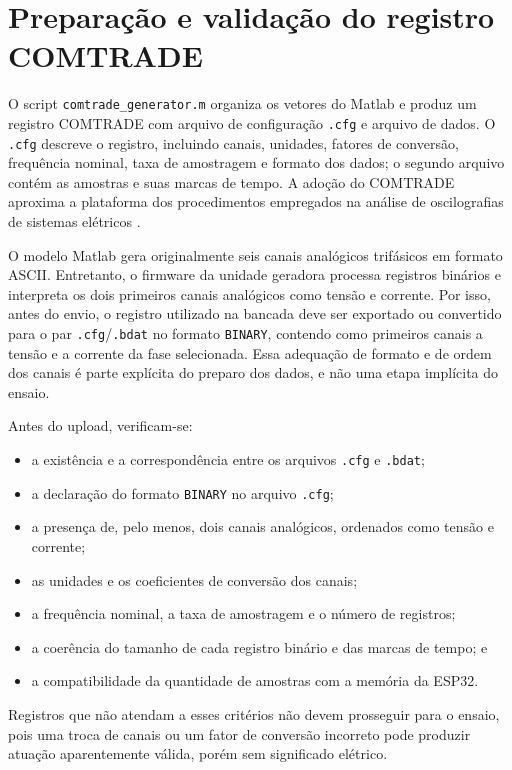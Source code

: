 \section{Preparação e validação do registro COMTRADE}

O script \texttt{comtrade\_generator.m} organiza os vetores do Matlab e produz um registro COMTRADE com arquivo de configuração \texttt{.cfg} e arquivo de dados. O \texttt{.cfg} descreve o registro, incluindo canais, unidades, fatores de conversão, frequência nominal, taxa de amostragem e formato dos dados; o segundo arquivo contém as amostras e suas marcas de tempo. A adoção do COMTRADE aproxima a plataforma dos procedimentos empregados na análise de oscilografias de sistemas elétricos \cite{ieee_comtrade,iec_60255_24_2013}.

O modelo Matlab gera originalmente seis canais analógicos trifásicos em formato ASCII. Entretanto, o firmware  da unidade geradora processa registros binários e interpreta os dois primeiros canais analógicos como tensão e corrente. Por isso, antes do envio, o registro utilizado na bancada deve ser exportado ou convertido para o par \texttt{.cfg}/\texttt{.bdat} no formato \texttt{BINARY}, contendo como primeiros canais a tensão e a corrente da fase selecionada. Essa adequação de formato e de ordem dos canais é parte explícita do preparo dos dados, e não uma etapa implícita do ensaio.

Antes do upload, verificam-se:

\begin{itemize}
  \item a existência e a correspondência entre os arquivos \texttt{.cfg} e \texttt{.bdat};
  \item a declaração do formato \texttt{BINARY} no arquivo \texttt{.cfg};
  \item a presença de, pelo menos, dois canais analógicos, ordenados como tensão e corrente;
  \item as unidades e os coeficientes de conversão dos canais;
  \item a frequência nominal, a taxa de amostragem e o número de registros;
  \item a coerência do tamanho de cada registro binário e das marcas de tempo; e
  \item a compatibilidade da quantidade de amostras com a memória da ESP32.
\end{itemize}

Registros que não atendam a esses critérios não devem prosseguir para o ensaio, pois uma troca de canais ou um fator de conversão incorreto pode produzir atuação aparentemente válida, porém sem significado elétrico.


